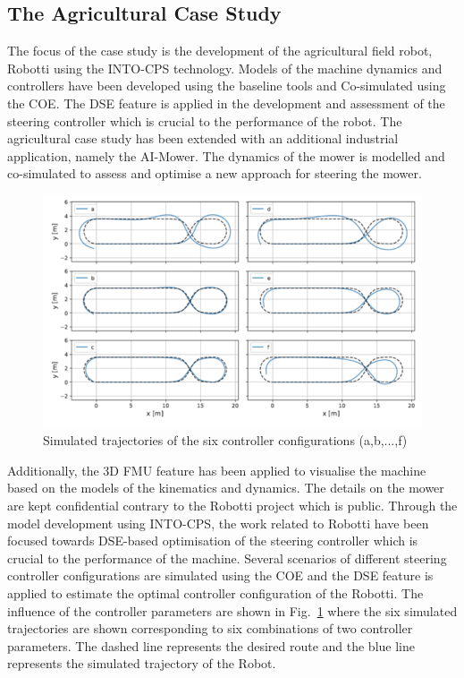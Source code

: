 \subsection{The Agricultural Case Study} 

The focus of the case study is the development of the agricultural field robot, Robotti using the INTO-CPS technology. Models of the machine dynamics and controllers have been developed using the baseline tools and Co-simulated using the COE. The DSE feature is applied in the development and assessment of the steering controller which is crucial to the performance of the robot. The agricultural case study has been extended with an additional industrial application, namely the AI-Mower. The dynamics of the mower is modelled and co-simulated to assess and optimise a new approach for steering the mower. 

\begin{figure}[!ht]
	\centering
		\includegraphics[width=0.9 \textwidth]{./figures/agri}
	\caption{Simulated trajectories of the six controller configurations (a,b,...,f)}
	\label{fig:agri}
\end{figure}

Additionally, the 3D FMU feature has been applied to visualise the machine based on the models of the kinematics and dynamics. The details on the mower are kept confidential contrary to the Robotti project which is public.
Through the model development using INTO-CPS, the work related to Robotti have been focused towards DSE-based optimisation of the steering controller which is crucial to the performance of the machine. Several scenarios of different steering controller configurations are simulated using the COE and the DSE feature is applied to estimate the optimal controller configuration of the Robotti. The influence of the controller parameters are shown in Fig.~\ref{fig:agri} where the six simulated trajectories are shown corresponding to six combinations of two controller parameters. The dashed line represents the desired route and the blue line represents the simulated trajectory of the Robot.

